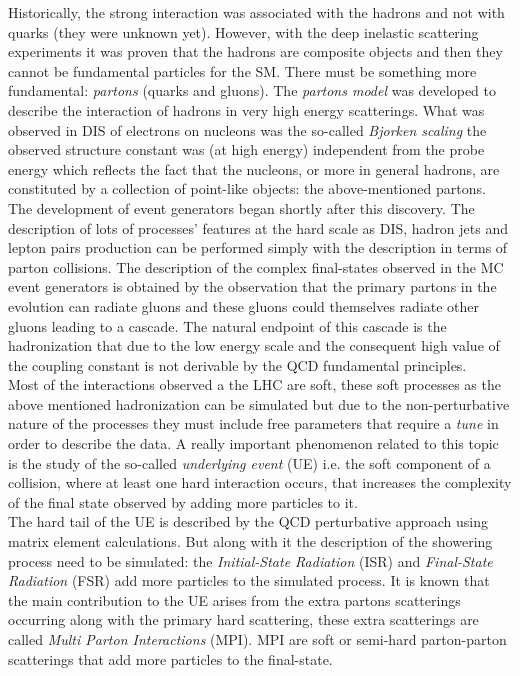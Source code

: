 Historically, the strong interaction was associated with the hadrons and not with quarks (they were unknown yet). However, with the deep inelastic scattering experiments \cite{DIS} it was proven that the hadrons are composite objects and then they cannot be fundamental particles for the SM. There must be something more fundamental: \textit{partons} (quarks and gluons). The \textit{partons model} \cite{Feynman:1969wa} was developed to describe the interaction of hadrons in very high energy scatterings. What was observed in DIS of electrons on nucleons was the so-called \textit{Bjorken scaling} the observed structure constant was (at high energy) independent from the probe energy which reflects the fact that the nucleons, or more in general hadrons, are constituted by a collection of point-like objects: the above-mentioned partons.
\\
The development of event generators began shortly after this discovery. The description of lots of processes' features at the hard scale as  DIS, hadron jets and lepton pairs production can be performed simply with the description in terms of parton collisions. The description of the complex final-states observed in the MC event generators is obtained by the observation that the primary partons in the evolution can radiate gluons and these gluons could themselves radiate other gluons leading to a cascade. The natural endpoint of this cascade is the hadronization that due to the low energy scale and the consequent high value of the coupling constant is not derivable by the QCD fundamental principles.
\\
Most of the interactions observed a the LHC are soft, these soft processes as the above mentioned hadronization can be simulated but due to the non-perturbative nature of the processes they must include free parameters that require a \textit{tune} in order to describe the data. A really important phenomenon related to this topic is the study of the so-called \textit{underlying event} (UE) i.e. the soft component of a collision, where at least one hard interaction occurs, that increases the complexity of the final state observed by adding more particles to it.  
\\
The hard tail of the UE is described by the QCD perturbative approach using matrix element calculations. But along with it the description of the showering process need to be simulated: the \textit{Initial-State Radiation} (ISR) and \textit{Final-State Radiation} (FSR) add more particles to the simulated process. It is known that the main contribution to the UE arises from the extra partons scatterings occurring along with the primary hard scattering, these extra scatterings are called \textit{Multi Parton Interactions} (MPI). MPI are soft or semi-hard parton-parton scatterings that add more particles to the final-state. 
